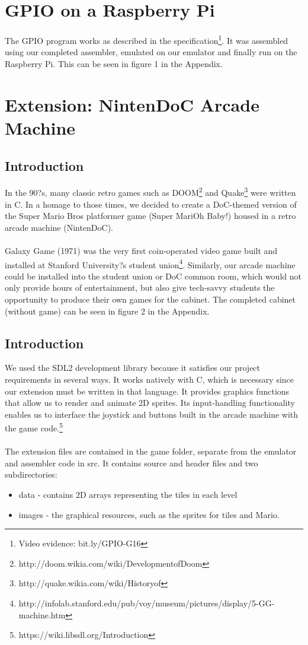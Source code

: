 \documentclass[11pt,twoside]{article}
\begin{document}
\section{GPIO on a Raspberry Pi}
The GPIO program works as described in the specification\footnote{Video evidence: bit.ly/GPIO-G16}. It was assembled using our completed assembler, emulated on our emulator and finally run on the Raspberry Pi. This can be seen in figure 1 in the Appendix.

\section{Extension: NintenDoC Arcade Machine}
\subsection{Introduction}
In the 90?s, many classic retro games such as DOOM\footnote{http://doom.wikia.com/wiki/Development\textunderscore of\textunderscore Doom} and Quake\footnote{http://quake.wikia.com/wiki/History\textunderscore of\textunderscore} were written in C. In a homage to those times, we decided to create a DoC-themed version of the Super Mario Bros platformer game (Super MariOh Baby!) housed in a retro arcade machine (NintenDoC).
\\\\
Galaxy Game (1971) was the very first coin-operated video game built and installed at Stanford University?s student union\footnote{http://infolab.stanford.edu/pub/voy/museum/pictures/display/5-GG-machine.htm}. Similarly, our arcade machine could be installed into the student union or DoC common room, which would not only provide hours of entertainment, but also give tech-savvy students the opportunity to produce their own games for the cabinet. The completed cabinet (without game) can be seen in figure 2 in the Appendix.

\subsection{Introduction}
We used the SDL2 development library because it satisfies our project requirements in several ways. It works natively with C, which is necessary since our extension must be written in that language. It provides graphics functions that allow us to render and animate 2D sprites. Its input-handling functionality enables us to interface the joystick and buttons built in the arcade machine with the game code.\footnote{https://wiki.libsdl.org/Introduction}
\\\\
The extension files are contained in the game folder, separate from the emulator and assembler code in src. It contains source and header files and two subdirectories: 
\begin{itemize}
\item data - contains 2D arrays representing the tiles in each level
\item images - the graphical resources, such as the sprites for tiles and Mario.
\end{itemize}
\end{document}
